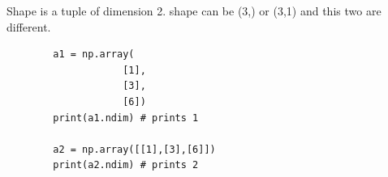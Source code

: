 Shape is a tuple of dimension 2. shape can be (3,) or (3,1) and this two are different.

\begin{verbatim}
        a1 = np.array(
                    [1],
                    [3],
                    [6])
        print(a1.ndim) # prints 1
        
        a2 = np.array([[1],[3],[6]])
        print(a2.ndim) # prints 2
\end{verbatim}